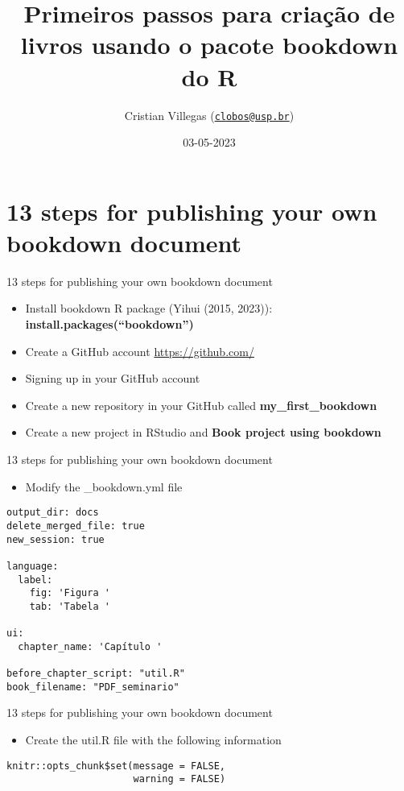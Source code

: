 \documentclass[
  ignorenonframetext,
]{beamer}
\title{Primeiros passos para criação de livros usando o pacote bookdown
do R}
\author{Cristian Villegas
(\href{mailto:clobos@usp.br}{\nolinkurl{clobos@usp.br}})}
\date{03-05-2023}
\institute{USP, Departamento de Ciências Exatas}
\providecommand{\tightlist}{%
  \setlength{\itemsep}{0pt}\setlength{\parskip}{0pt}}
\begin{document}
\frame{\titlepage}

\hypertarget{steps-for-publishing-your-own-bookdown-document}{%
\section{13 steps for publishing your own bookdown
document}\label{steps-for-publishing-your-own-bookdown-document}}

\begin{frame}{13 steps for publishing your own bookdown document}
\protect\hypertarget{steps-for-publishing-your-own-bookdown-document-1}{}
\begin{itemize}
\tightlist
\item
  Install bookdown R package (Yihui (2015, 2023)):
  \textbf{install.packages(``bookdown'')}
\item
  Create a GitHub account \url{https://github.com/}
\item
  Signing up in your GitHub account
\item
  Create a new repository in your GitHub called
  \textbf{my\_first\_bookdown}
\item
  Create a new project in RStudio and \textbf{Book project using
  bookdown}
\end{itemize}
\end{frame}

\begin{frame}[fragile]{13 steps for publishing your own bookdown
document}
\protect\hypertarget{steps-for-publishing-your-own-bookdown-document-2}{}
\begin{itemize}
\tightlist
\item
  Modify the \_bookdown.yml file
\end{itemize}

\begin{verbatim}
output_dir: docs
delete_merged_file: true
new_session: true

language:
  label:
    fig: 'Figura '
    tab: 'Tabela '

ui:
  chapter_name: 'Capítulo '
  
before_chapter_script: "util.R"
book_filename: "PDF_seminario" 
\end{verbatim}
\end{frame}

\begin{frame}[fragile]{13 steps for publishing your own bookdown
document}
\protect\hypertarget{steps-for-publishing-your-own-bookdown-document-3}{}
\begin{itemize}
\tightlist
\item
  Create the util.R file with the following information
\end{itemize}

\begin{verbatim}
knitr::opts_chunk$set(message = FALSE, 
                      warning = FALSE)
\end{verbatim}
\end{frame}
\end{document}
